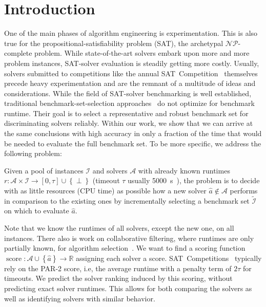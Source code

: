 \documentclass[runningheads]{llncs}
\begin{document}
\section{Introduction}
\label{sec:intro}
One of the main phases of algorithm engineering is experimentation.
This is also true for the pro\-po\-si\-tio\-nal-sat\-is\-fia\-bi\-li\-ty problem (SAT), the archetypal $\mathcal{NP}$-complete problem.
While state-of-the-art solvers embark upon more and more problem instances, SAT-solver evaluation is steadily getting more costly.
Usually, solvers submitted to competitions like the annual SAT~Competition~\cite{FroleyksHIJS21,sat2022} themselves precede heavy experimentation and are the remnant of a multitude of ideas and considerations.
While the field of SAT-solver benchmarking is well established, traditional benchmark-set-selection approaches~\cite{Gelder11,HoosKSS13} do not optimize for benchmark runtime.
Their goal is to select a representative and robust benchmark set for discriminating solvers reliably.
Within our work, we show that we can arrive at the same conclusions with high accuracy in only a fraction of the time that would be needed to evaluate the full benchmark set.
To be more specific, we address the following problem:

\begin{definition}
	Given a pool of instances $\mathcal{I}$ and solvers $\mathcal{A}$ with already known runtimes $r\!: \mathcal{A} \times \mathcal{I} \rightarrow \left[0, \tau\right] \cup \left\lbrace \perp \right\rbrace$ (timeout $\tau$ usually \SI{5000}{s}~\cite{FroleyksHIJS21}), the problem is to decide with as little resources (CPU time) as possible how a new solver $\hat{a} \notin \mathcal{A}$ performs in comparison to the existing ones by incrementally selecting a benchmark set $\tilde{\mathcal{I}}$ on which to evaluate $\hat{a}$.
	\label{def:new-solver-problem}
\end{definition}

Note that we know the runtimes of all solvers, except the new one, on all instances.
There also is work on collaborative filtering, where runtimes are only partially known, for algorithm selection~\cite{misir2017alors,misir2017data}.
We want to find a scoring function $\operatorname{score}\!: \mathcal{A} \cup \left\lbrace \hat{a} \right\rbrace \rightarrow \mathbb{R}$ assigning each solver a score.
SAT~Competitions~\cite{FroleyksHIJS21} typically rely on the PAR-2 score, i.e, the average runtime with a penalty term of $2\tau$ for timeouts.
We predict the solver ranking induced by this scoring, without predicting exact solver runtimes.
This allows for both comparing the solvers as well as identifying solvers with similar behavior.
\end{document}
